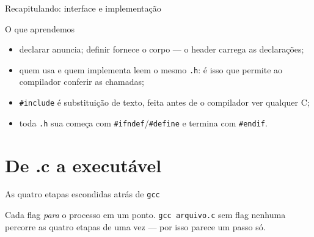 \documentclass[aspectratio=169]{beamer}
\begin{document}
\begin{frame}{Recapitulando: interface e implementação}
  \begin{block}{O que aprendemos}
    \begin{itemize}
      \item declarar anuncia; definir fornece o corpo --- o header carrega as
        declarações;
      \item quem usa e quem implementa leem o mesmo \texttt{.h}: é isso que
        permite ao compilador conferir as chamadas;
      \item \texttt{\#include} é substituição de texto, feita antes de o
        compilador ver qualquer C;
      \item toda \texttt{.h} sua começa com \texttt{\#ifndef}/\texttt{\#define}
        e termina com \texttt{\#endif}.
    \end{itemize}
  \end{block}
\end{frame}

\section{De .c a executável}

\begin{frame}{As quatro etapas escondidas atrás de \texttt{gcc}}
  \begin{center}
  \end{center}
  \begin{block}{}
    \small Cada flag \emph{para} o processo em um ponto. \texttt{gcc arquivo.c}
    sem flag nenhuma percorre as quatro etapas de uma vez --- por isso parece
    um passo só.
  \end{block}
\end{frame}
\end{document}
